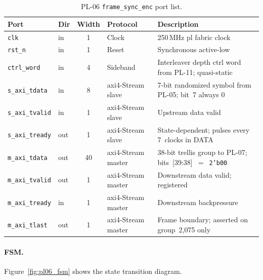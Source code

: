 \begin{table}[htbp]
  \caption{PL-06 \texttt{frame\_sync\_enc} port list.}
  \label{tab:pl06_ports}
  \centering
  \small
  \begin{tabular}{llcp{2.7cm}p{5.8cm}}
    \hline
    Port                    & Dir  & Width & Protocol               & Description \\
    \hline
    \texttt{clk}            & in   & 1     & Clock                  & 250\,MHz \ac{pl} fabric clock \\[2pt]
    \texttt{rst\_n}         & in   & 1     & Reset                  & Synchronous active-low \\[2pt]
    \texttt{ctrl\_word}     & in   & 4     & Sideband               & Interleaver depth ctrl word from PL-11; quasi-static \\[2pt]
    \texttt{s\_axi\_tdata}  & in   & 8     & \ac{axi}4-Stream slave & 7-bit randomized symbol from PL-05; bit~7 always 0 \\[2pt]
    \texttt{s\_axi\_tvalid} & in   & 1     & \ac{axi}4-Stream slave & Upstream data valid \\[2pt]
    \texttt{s\_axi\_tready} & out  & 1     & \ac{axi}4-Stream slave & State-dependent; pulses every 7~clocks in DATA \\[2pt]
    \texttt{m\_axi\_tdata}  & out  & 40    & \ac{axi}4-Stream master & 38-bit trellis group to PL-07; bits~[39:38]~$=$~\texttt{2'b00} \\[2pt]
    \texttt{m\_axi\_tvalid} & out  & 1     & \ac{axi}4-Stream master & Downstream data valid; registered \\[2pt]
    \texttt{m\_axi\_tready} & in   & 1     & \ac{axi}4-Stream master & Downstream backpressure \\[2pt]
    \texttt{m\_axi\_tlast}  & out  & 1     & \ac{axi}4-Stream master & Frame boundary; asserted on group~2{,}075 only \\
    \hline
  \end{tabular}
\end{table}


\FloatBarrier
\clearpage
\paragraph{FSM.}

Figure~\ref{fig:pl06_fsm} shows the state transition diagram.

